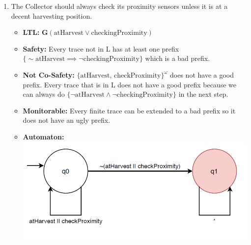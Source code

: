 \documentclass[12pt]{article}
\begin{document}
\begin{enumerate}
\item The Collector should always check its proximity sensors unless it is at a decent harvesting position.
	\begin{itemize}
		\item \textbf{LTL:} $\mathbf{G}(\text{atHarvest} \lor \text{checkingProximity})$
		\item \textbf{Safety:} Every trace not in L has at least one prefix \\
		$\{ \sim \text{atHarvest}  \implies \neg \text{checkingProximity}\}$ which is a bad prefix.
		\item \textbf{Not Co-Safety:} $\{ \text{atHarvest, checkProximity}\}^ {\omega}$ does not have a good prefix. Every trace that is in L does not have a good prefix because we can always do $\{ \neg \text{atHarvest}  \land \neg \text{checkingProximity}\}$ in the next step.
		\item \textbf{Monitorable:} Every finite trace can be extended to a bad prefix so it does not have an ugly prefix.
		\item \textbf{Automaton:} \\
			\includegraphics[scale = 0.5]{images/checkProximityAutomaton}
	\end{itemize}		
	

\end{enumerate}
\end{document}
